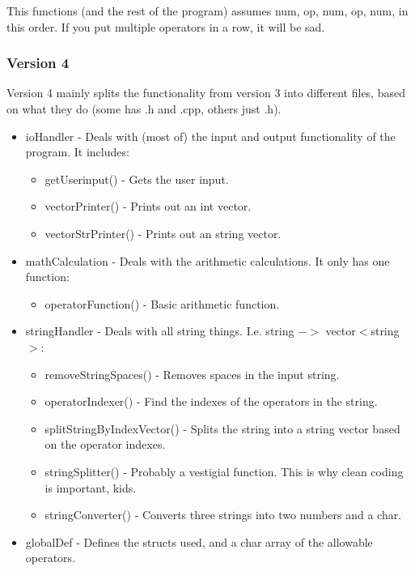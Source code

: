 \documentclass{article}
\begin{document}
				This functions (and the rest of the program) assumes num, op, num, op, num, in this order. If you put multiple operators in a row, it will be sad.
			
			
			\subsubsection{Version 4}
				Version 4 mainly splits the functionality from version 3 into different files, based on what they do (some has .h and .cpp, others just .h).
				\begin{itemize}
					\item ioHandler 		- Deals with (most of) the input and output functionality of the program. It includes:
					\begin{itemize}
						\item getUserinput()			 - Gets the user input.
						\item vectorPrinter()			 - Prints out an int vector.
						\item vectorStrPrinter() 		 - Prints out an string vector.
					\end{itemize}
					
					\item mathCalculation 	- Deals with the arithmetic calculations. It only has one function:
					\begin{itemize}
						\item operatorFunction()		 - Basic arithmetic function.
					\end{itemize}
					
					\item stringHandler 	- Deals with all string things. I.e. string $->$ vector$<$string$>$:
					\begin{itemize}
						\item removeStringSpaces()		 - Removes spaces in the input string.
						\item operatorIndexer()			 - Find the indexes of the operators in the string.
						\item splitStringByIndexVector() - Splits the string into a string vector based on the operator indexes.
						\item stringSplitter()			 - Probably a vestigial function. This is why clean coding is important, kids.
						\item stringConverter()			 - Converts three strings into two numbers and a char.
					\end{itemize}
					
					\item globalDef			- Defines the structs used, and a char array of the allowable operators.
				\end{itemize}
		
\end{document}
